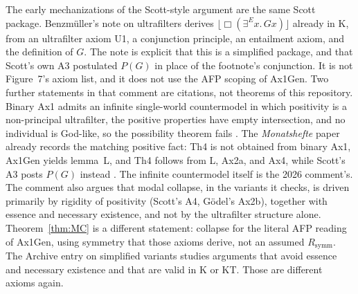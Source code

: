 \documentclass[11pt,a4paper]{article}
\newcommand{\valid}[1]{\lfloor #1 \rfloor}
\newcommand{\Nec}{\Box}
\newcommand{\exE}{\exists^{E}}
\theoremstyle{definition}
\theoremstyle{remark}
\begin{document}
The early mechanizations of the Scott-style argument
\cite{benzmuellerPaleo2014} are the same Scott package.
Benzm\"uller's note on ultrafilters \cite{benzmueller2026} derives
\(\valid{\Nec(\exE x.\, G x)}\) already in K, from an ultrafilter axiom U1, a
conjunction principle, an entailment axiom, and the definition of \(G\).
The note is explicit that this is a simplified package, and that Scott's own
A3 postulated \(P(G)\) in place of the footnote's conjunction.
It is not Figure~7's axiom list, and it does not use the AFP scoping of
Ax1Gen.
Two further statements in that comment are citations, not theorems of this
repository.
Binary Ax1 admits an infinite single-world countermodel in which positivity
is a non-principal ultrafilter, the positive properties have empty
intersection, and no individual is God-like, so the possibility theorem fails
\cite{benzmueller2026}.
The \emph{Monatshefte} paper already records the matching positive fact: Th4
is not obtained from binary Ax1, Ax1Gen yields lemma~L, and Th4 follows from
L, Ax2a, and Ax4, while Scott's A3 posts \(P(G)\) instead
\cite{benzmuellerScott2025}.
The infinite countermodel itself is the 2026 comment's.
The comment also argues that modal collapse, in the variants it checks, is
driven primarily by rigidity of positivity (Scott's A4, G\"odel's Ax2b),
together with essence and necessary existence, and not by the ultrafilter
structure alone.
Theorem~\ref{thm:MC} is a different statement: collapse for the literal AFP
reading of Ax1Gen, using symmetry that those axioms derive, not an assumed
\(R_{\mathrm{symm}}\).
The Archive entry on simplified variants \cite{afpSimplified2021} studies
arguments that avoid essence and necessary existence and that are valid in K
or KT.
Those are different axioms again.
\end{document}
